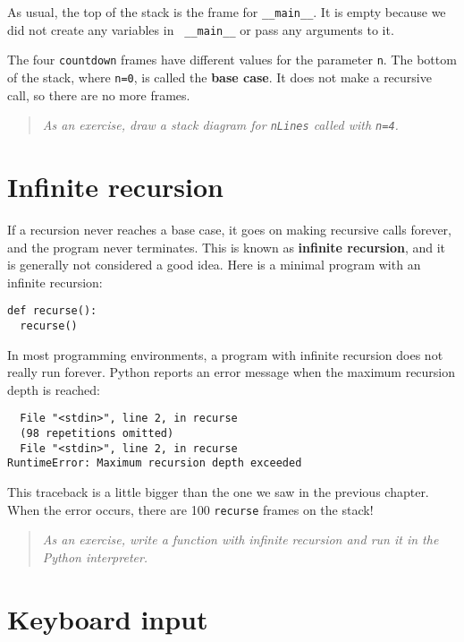 As usual, the top of the stack is the frame for {\tt \_\_main\_\_}.
It is empty because we did not create any variables in {\tt
\_\_main\_\_} or pass any arguments to it.

The four {\tt countdown} frames have different values for the
parameter {\tt n}.  The bottom of the stack, where {\tt n=0}, is
called the {\bf base case}.  It does not make a recursive call, so
there are no more frames.

\begin{quote}
{\em As an exercise, draw a stack diagram for {\tt nLines} called with
{\tt n=4}.}
\end{quote}



\section{Infinite recursion}

If a recursion never reaches a base case, it goes on making
recursive calls forever, and the program never terminates.  This is
known as {\bf infinite recursion}, and it is generally not considered
a good idea.  Here is a minimal program with an infinite recursion:

\beforeverb
\begin{verbatim}
def recurse():
  recurse()
\end{verbatim}
\afterverb
%
In most programming environments, a program with infinite recursion
does not really run forever.  Python reports an error
message when the maximum recursion depth is reached:

\beforeverb
\begin{verbatim}
  File "<stdin>", line 2, in recurse
  (98 repetitions omitted)
  File "<stdin>", line 2, in recurse
RuntimeError: Maximum recursion depth exceeded
\end{verbatim}
\afterverb
%
This traceback is a little bigger than the one we saw in the
previous chapter.  When the error occurs, there are 100
{\tt recurse} frames on the stack!

\begin{quote}
{\em As an exercise, write a function with infinite recursion and run
it in the Python interpreter.}
\end{quote}


\section{Keyboard input}

